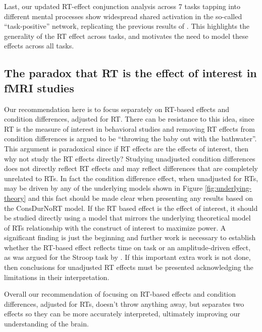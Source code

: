 \documentclass[titlepage,12pt] {article}
\begin{document}
Last, our updated RT-effect conjunction analysis across 7 tasks tapping into different mental processes show widespread shared activation in the so-called ``task-positive'' network, replicating the previous results of \citet{yarkoni_bold_2009}. This highlights the generality of the RT effect across tasks, and motivates the need to model these effects across all tasks.  

\subsection*{The paradox that RT is the effect of interest in fMRI studies}

Our recommendation here is to focus separately on RT-based effects and condition differences, adjusted for RT.  There can be resistance to this idea, since RT is the measure of interest in behavioral studies and removing RT effects from condition differences is argued to be ``throwing the baby out with the bathwater''.  This argument is paradoxical since if RT effects are the effects of interest, then why not study the RT effects directly? Studying unadjusted condition differences does not directly reflect RT effects and may reflect differences that are completely unrelated to RTs.  In fact the condition difference effect, when unadjusted for RTs, may be driven by any of the underlying models shown in Figure \ref{fig:underlying-theory} and this fact should be made clear when presenting any results based on the ConsDurNoRT model.  If the RT based effect is the effect of interest, it should be studied directly using a model that mirrors the underlying theoretical model of RTs relationship with the construct of interest to maximize power.  A significant finding is just the beginning and further work is necessary to establish whether the RT-based effect reflects time on task or an amplitude-driven effect, as was argued for the Stroop task by \citet{yeung_errors_2011}.  If this important extra work is not done, then conclusions for unadjusted RT effects must be presented acknowledging the limitations in their interpretation.

Overall our recommendation of focusing on RT-based effects and condition differences, adjusted for RTs, doesn't throw anything away, but separates two effects so they can be more accurately interpreted, ultimately improving our understanding of the brain. 
\end{document}
